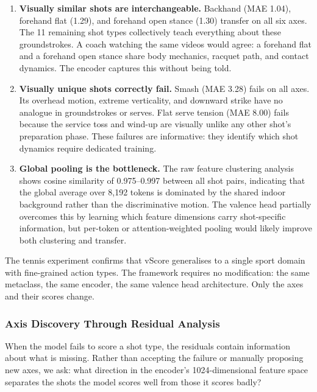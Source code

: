\documentclass[11pt]{article}
\begin{document}
\begin{enumerate}
    \item \textbf{Visually similar shots are interchangeable.} Backhand (MAE 1.04), forehand flat (1.29), and forehand open stance (1.30) transfer on all six axes. The 11 remaining shot types collectively teach everything about these groundstrokes. A coach watching the same videos would agree: a forehand flat and a forehand open stance share body mechanics, racquet path, and contact dynamics. The encoder captures this without being told.

    \item \textbf{Visually unique shots correctly fail.} Smash (MAE 3.28) fails on all axes. Its overhead motion, extreme verticality, and downward strike have no analogue in groundstrokes or serves. Flat serve tension (MAE 8.00) fails because the service toss and wind-up are visually unlike any other shot's preparation phase. These failures are informative: they identify which shot dynamics require dedicated training.

    \item \textbf{Global pooling is the bottleneck.} The raw feature clustering analysis shows cosine similarity of 0.975--0.997 between all shot pairs, indicating that the global average over 8,192 tokens is dominated by the shared indoor background rather than the discriminative motion. The valence head partially overcomes this by learning which feature dimensions carry shot-specific information, but per-token or attention-weighted pooling would likely improve both clustering and transfer.
\end{enumerate}

The tennis experiment confirms that vScore generalises to a single sport domain with fine-grained action types. The framework requires no modification: the same metaclass, the same encoder, the same valence head architecture. Only the axes and their scores change.

\subsubsection{Axis Discovery Through Residual Analysis}

When the model fails to score a shot type, the residuals contain information about what is missing. Rather than accepting the failure or manually proposing new axes, we ask: what direction in the encoder's 1024-dimensional feature space separates the shots the model scores well from those it scores badly?
\end{document}
